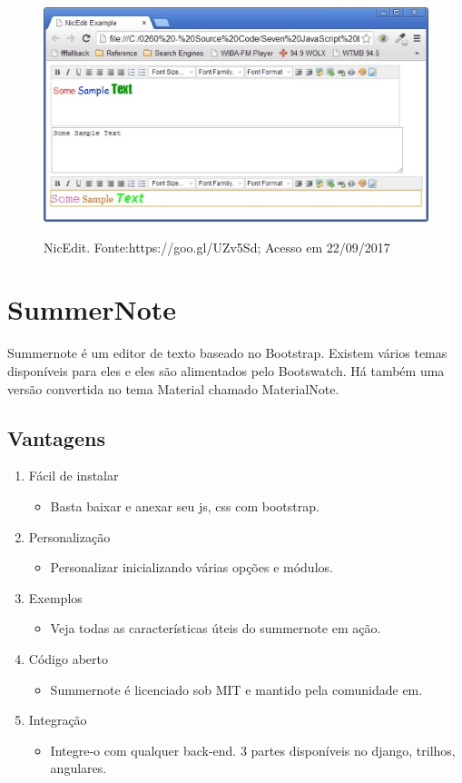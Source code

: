 \documentclass[12pt,a4paper]{article}
\begin{document}
\begin{figure}[h]
\centering
\includegraphics[width=13cm]{recursos/NicEdit/NicEdit.jpg}
\label{2}
\caption{NicEdit. Fonte:https://goo.gl/UZv5Sd; Acesso em 22/09/2017}
\end{figure}


\section{SummerNote}
Summernote é um editor de texto baseado no Bootstrap. Existem vários temas disponíveis para eles e eles são alimentados pelo Bootswatch. Há também uma versão convertida no tema Material chamado MaterialNote.

\subsection{Vantagens}
\begin{enumerate}
\item Fácil de instalar
\begin{itemize}
\item Basta baixar e anexar seu js, css com bootstrap.
\end{itemize}
\item Personalização
\begin{itemize}
\item Personalizar inicializando várias opções e módulos.
\end{itemize}
\item Exemplos
\begin{itemize}
\item Veja todas as características úteis do summernote em ação.
\end{itemize}
\item Código aberto
\begin{itemize}
\item Summernote é licenciado sob MIT e mantido pela comunidade em.
\end{itemize}
\item Integração
\begin{itemize}
\item Integre-o com qualquer back-end. 3 partes disponíveis no django, trilhos, angulares.
\end{itemize}
\end{enumerate}
\end{document}
